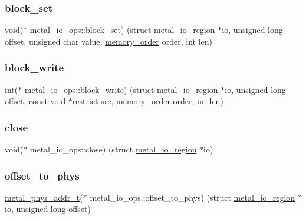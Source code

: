 \subsubsection{\texorpdfstring{block\+\_\+set}{block\_set}}
{\footnotesize\ttfamily void($\ast$ metal\+\_\+io\+\_\+ops\+::block\+\_\+set) (struct \hyperlink{structmetal__io__region}{metal\+\_\+io\+\_\+region} $\ast$io, unsigned long offset, unsigned char value, \hyperlink{compiler_2gcc_2atomic_8h_a17c2de5ae768960284c047a320f17d1b}{memory\+\_\+order} order, int len)}

\mbox{\label{structmetal__io__ops_aa935d3f9b5c10d0e674dd86c19dfb21c}} 
\subsubsection{\texorpdfstring{block\+\_\+write}{block\_write}}
{\footnotesize\ttfamily int($\ast$ metal\+\_\+io\+\_\+ops\+::block\+\_\+write) (struct \hyperlink{structmetal__io__region}{metal\+\_\+io\+\_\+region} $\ast$io, unsigned long offset, const void $\ast$\hyperlink{compiler_2iar_2compiler_8h_a080abdcb9c02438f1cd2bb707af25af8}{restrict} src, \hyperlink{compiler_2gcc_2atomic_8h_a17c2de5ae768960284c047a320f17d1b}{memory\+\_\+order} order, int len)}

\mbox{\label{structmetal__io__ops_a25310b7272817558438e1feb03b24d14}} 
\subsubsection{\texorpdfstring{close}{close}}
{\footnotesize\ttfamily void($\ast$ metal\+\_\+io\+\_\+ops\+::close) (struct \hyperlink{structmetal__io__region}{metal\+\_\+io\+\_\+region} $\ast$io)}

\mbox{\label{structmetal__io__ops_a609d8698238e0895b98fdc5c4fad67a3}} 
\subsubsection{\texorpdfstring{offset\+\_\+to\+\_\+phys}{offset\_to\_phys}}
{\footnotesize\ttfamily \hyperlink{group__system_gae024fa10b72199a3e26c29b6eb97df5d}{metal\+\_\+phys\+\_\+addr\+\_\+t}($\ast$ metal\+\_\+io\+\_\+ops\+::offset\+\_\+to\+\_\+phys) (struct \hyperlink{structmetal__io__region}{metal\+\_\+io\+\_\+region} $\ast$io, unsigned long offset)}

